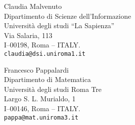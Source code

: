 \documentclass[10pt,a4paper,twoside]{article}
\begin{document}
\begin{footnotesize}
\noindent Claudia Malvenuto\\
Dipartimento di Scienze dell'Informazione\\
Universit\`a degli studi ``La Sapienza''\\
Via Salaria, 113\\
I--00198, Roma -- ITALY.\\
\texttt{claudia@dsi.uniroma1.it}
\bigskip

\noindent Francesco Pappalardi\\
Dipartimento di Matematica\\
Universit\`a degli studi Roma Tre\\
Largo S. L. Murialdo, 1\\
I--00146, Roma -- ITALY.\\
\texttt{pappa@mat.uniroma3.it}\vfill
\end{footnotesize}
\end{document}
